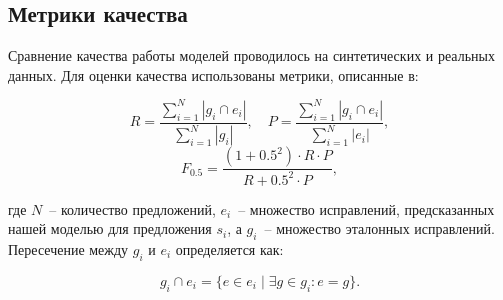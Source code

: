 \subsection{Метрики качества}

Сравнение качества работы моделей проводилось на синтетических и реальных данных. Для оценки качества использованы метрики, описанные в\cite{b11}:

\begin{equation*}
    R = \frac{\sum_{i=1}^{N} |g_i \cap e_i|}{\sum_{i=1}^{N} |g_i|}, \quad
    P = \frac{\sum_{i=1}^{N} |g_i \cap e_i|}{\sum_{i=1}^{N} |e_i|},
\end{equation*}
\begin{equation*}
    F_{0.5} = \frac{(1 + 0.5^2) \cdot R \cdot P}{R + 0.5^2 \cdot P},
\end{equation*}

где $N$~-- количество предложений, $e_i$~-- множество исправлений, предсказанных нашей моделью для предложения $s_i$, а $g_i$~-- множество эталонных исправлений. Пересечение между $g_i$ и $e_i$ определяется как:

\begin{equation*}
    g_i \cap e_i = \{ e \in e_i \mid \exists g \in g_i \colon e = g \}.
\end{equation*}


